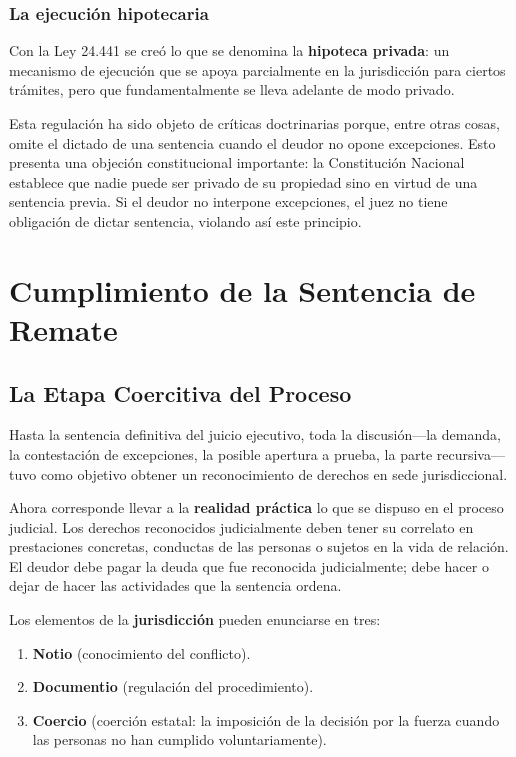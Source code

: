 \documentclass[12pt,oneside]{book}
\begin{document}
\subsection{La ejecución hipotecaria}

Con la Ley 24.441 se creó lo que se denomina la \textbf{hipoteca privada}: un mecanismo de ejecución que se apoya parcialmente en la jurisdicción para ciertos trámites, pero que fundamentalmente se lleva adelante de modo privado.

Esta regulación ha sido objeto de críticas doctrinarias porque, entre otras cosas, omite el dictado de una sentencia cuando el deudor no opone excepciones. Esto presenta una objeción constitucional importante: la Constitución Nacional establece que nadie puede ser privado de su propiedad sino en virtud de una sentencia previa. Si el deudor no interpone excepciones, el juez no tiene obligación de dictar sentencia, violando así este principio.


\chapter{Cumplimiento de la Sentencia de Remate}

\section{La Etapa Coercitiva del Proceso}

Hasta la sentencia definitiva del juicio ejecutivo, toda la discusión---la demanda, la contestación de excepciones, la posible apertura a prueba, la parte recursiva---tuvo como objetivo obtener un reconocimiento de derechos en sede jurisdiccional.

Ahora corresponde llevar a la \textbf{realidad práctica} lo que se dispuso en el proceso judicial. Los derechos reconocidos judicialmente deben tener su correlato en prestaciones concretas, conductas de las personas o sujetos en la vida de relación. El deudor debe pagar la deuda que fue reconocida judicialmente; debe hacer o dejar de hacer las actividades que la sentencia ordena.

Los elementos de la \textbf{jurisdicción} pueden enunciarse en tres:

\begin{enumerate}
    \item \textbf{Notio} (conocimiento del conflicto).
    \item \textbf{Documentio} (regulación del procedimiento).
    \item \textbf{Coercio} (coerción estatal: la imposición de la decisión por la fuerza cuando las personas no han cumplido voluntariamente).
\end{enumerate}
\end{document}
